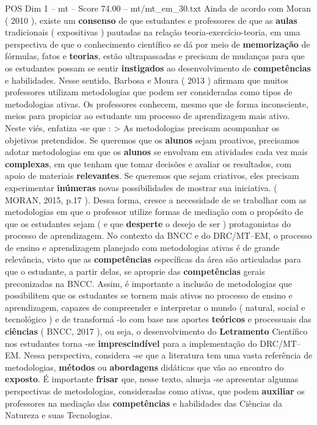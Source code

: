 \begin{textsample}{POS Dim 1 – mt – Score 74.00 – mt/mt\_em\_30.txt}
Ainda de acordo com Moran ( 2010 ), existe um \textbf{consenso} de que estudantes e professores de que as \textbf{aulas} tradicionais ( expositivas ) pautadas na relação teoria-exercício-teoria, em uma perspectiva de que o conhecimento científico se dá por meio de \textbf{memorização} de fórmulas, fatos e \textbf{teorias}, estão ultrapassadas e precisam de mudanças para que os estudantes possam se sentir \textbf{instigados} ao desenvolvimento de \textbf{competências} e habilidades.
Nesse sentido, Barbosa e Moura ( 2013 ) afirmam que muitos professores utilizam metodologias que podem ser consideradas como tipos de metodologias ativas.
Os professores conhecem, mesmo que de forma inconsciente, meios para propiciar ao estudante um processo de aprendizagem mais ativo.
Neste viés, enfatiza -se que : > As metodologias precisam acompanhar os objetivos pretendidos.
Se queremos que os \textbf{alunos} sejam proativos, precisamos adotar metodologias em que os \textbf{alunos} se envolvam em atividades cada vez mais \textbf{complexas}, em que tenham que tomar decisões e avaliar os resultados, com apoio de materiais \textbf{relevantes}.
Se queremos que sejam criativos, eles precisam experimentar \textbf{inúmeras} novas possibilidades de mostrar sua iniciativa. ( MORAN, 2015, p.17 ).
Dessa forma, cresce a necessidade de se trabalhar com as metodologias em que o professor utilize formas de mediação com o propósito de que os estudantes sejam ( e que \textbf{desperte} o desejo de ser ) protagonistas do processo de aprendizagem.
No contexto da BNCC e do DRC/MT–EM, o processo de ensino e aprendizagem planejado com metodologias ativas é de grande relevância, visto que as \textbf{competências} específicas da área são articuladas para que o estudante, a partir delas, se aproprie das \textbf{competências} gerais preconizadas na BNCC.
Assim, é importante a inclusão de metodologias que possibilitem que os estudantes se tornem mais ativos no processo de ensino e aprendizagem, capazes de compreender e interpretar o mundo ( natural, social e tecnológico ) e de transformá -lo com base nos aportes \textbf{teóricos} e processuais das \textbf{ciências} ( BNCC, 2017 ), ou seja, o desenvolvimento do \textbf{Letramento} Científico nos estudantes torna -se \textbf{imprescindível} para a implementação do DRC/MT–EM.
Nessa perspectiva, considera -se que a literatura tem uma vasta referência de metodologias, \textbf{métodos} ou \textbf{abordagens} didáticas que vão ao encontro do \textbf{exposto}.
É importante \textbf{frisar} que, nesse texto, almeja -se apresentar algumas perspectivas de metodologias, consideradas como ativas, que podem \textbf{auxiliar} os professores na mediação das \textbf{competências} e habilidades das Ciências da Natureza e suas Tecnologias.

\end{textsample}

